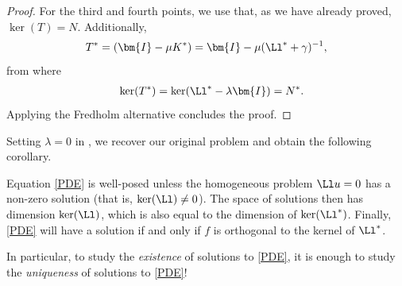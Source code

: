 \documentclass[
    a4paper,
    DIV=14,
    abstract=true,
    numbers=noenddot
]{scrartcl}
\begin{document}
\begin{proof}
    For the third and fourth points, we use that, as we have already proved, $\ker(T)=N$. Additionally,
    \begin{align*}
        T^* =(\bm{I}-\mu K^*) =\bm{I}-\mu (\Ll^*+ \gamma )^{-1},
    \end{align*}
    from where
    \begin{align*}
        \quad \ker(T^*)=\ker(\Ll^* -\lambda \bm{I})= N^*.
    \end{align*}
    Applying the Fredholm alternative concludes the proof.
\end{proof}
Setting $\lambda =0$ in , we recover our original problem and obtain the following corollary.
\begin{corollary}
    Equation \eqref{PDE} is well-posed unless the homogeneous problem $\Ll u=0$ has a non-zero solution (that is, $\ker(\Ll )\neq 0$). The space of solutions then has dimension $\ker(\Ll) $, which is also equal to the dimension of $\ker(\Ll ^*)$. Finally, \eqref{PDE} will have a solution if and only if $f$ is orthogonal to the kernel of $\Ll^*$.
\end{corollary}
In particular, to study the \emph{existence} of solutions to \eqref{PDE}, it is enough to study the \emph{uniqueness} of solutions to \eqref{PDE}!
\end{document}
